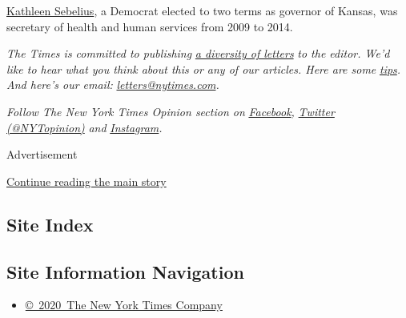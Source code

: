 \href{http://www.sebeliusresources.com/welcome-1}{Kathleen Sebelius}, a
Democrat elected to two terms as governor of Kansas, was secretary of
health and human services from 2009 to 2014.

\emph{The Times is committed to publishing}
\href{https://www.nytimes.com/2019/01/31/opinion/letters/letters-to-editor-new-york-times-women.html}{\emph{a
diversity of letters}} \emph{to the editor. We'd like to hear what you
think about this or any of our articles. Here are some}
\href{https://help.nytimes.com/hc/en-us/articles/115014925288-How-to-submit-a-letter-to-the-editor}{\emph{tips}}\emph{.
And here's our email:}
\href{mailto:letters@nytimes.com}{\emph{letters@nytimes.com}}\emph{.}

\emph{Follow The New York Times Opinion section on}
\href{https://www.facebook.com/nytopinion}{\emph{Facebook}}\emph{,}
\href{http://twitter.com/NYTOpinion}{\emph{Twitter (@NYTopinion)}}
\emph{and}
\href{https://www.instagram.com/nytopinion/}{\emph{Instagram}}\emph{.}

Advertisement

\protect\hyperlink{after-bottom}{Continue reading the main story}

\hypertarget{site-index}{%
\subsection{Site Index}\label{site-index}}

\hypertarget{site-information-navigation}{%
\subsection{Site Information
Navigation}\label{site-information-navigation}}

\begin{itemize}
\tightlist
\item
  \href{https://help.nytimes.com/hc/en-us/articles/115014792127-Copyright-notice}{©~2020~The
  New York Times Company}
\end{itemize}

